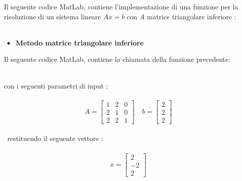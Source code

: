Il seguente codice MatLab, contiene l'implementazione di una funzione per la risoluzione di un sistema lineare $Ax=b$ con \textit{A} matrice triangolare inferiore :\\\
\begin{itemize}
	\item \textbf{Metodo matrice triangolare inferiore}
		
\end{itemize}
Il seguente codice MatLab, contiene la chiamata della funzione precedente:\\\
	
con i seguenti parametri di input :\\\
	\[
	A =\begin{bmatrix}
		1 & 2 & 0 \\ 
		2 & 1 & 0 \\
		2 & 2 & 1 
	\end{bmatrix} \quad
	b =\begin{bmatrix}
  		2 \\
  		2 \\
 	 	2
	\end{bmatrix}
	\]\\\
restituendo il seguente vettore :\\\
	\[
		x =\begin{bmatrix}
  		2 \\
  		-2 \\
 		2
	\end{bmatrix}
	 \]